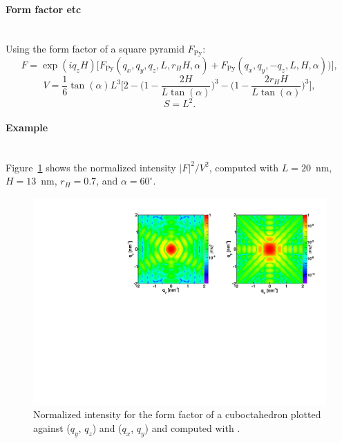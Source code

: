\paragraph{Form factor etc}\strut\\
Using the form factor of a square pyramid $F_\text{Py}$:
\begin{equation*}
F=\exp(iq_zH)\Big[F_\text{Py}(q_x,q_y, q_z, L, r_H H,\alpha)
                 +F_\text{Py}(q_x, q_y, -q_z, L, H, \alpha))\Big],
\end{equation*}
\begin{equation*}
  V= \dfrac{1}{6} \tan(\alpha)L^3 \Big[ 2
         - \Big(1 - \dfrac{2H }{L\tan(\alpha)} \Big)^3
           - \Big(1 - \dfrac{2 r_H
             H}{L\tan(\alpha) }\Big)^3\Big],
\end{equation*}
\begin{equation*}
  S =L^2.
\end{equation*}

\paragraph{Example}\strut\\
Figure~\ref{fig:FFcuboctahEx} shows the normalized intensity $|F|^2/V^2$, computed with $L=20$~nm, $H=13$~nm, $r_H=0.7$, and $\alpha=60^{\circ}$.
\begin{figure}[h]
\begin{center}
\includegraphics[angle=-90,width=\textwidth]{fig/ff/figffcuboctah.pdf}
\end{center}
\caption{Normalized intensity for the form factor of a cuboctahedron plotted against ($q_y$, $q_z$) and  ($q_x$, $q_y$) and computed with .}
\label{fig:FFcuboctahEx}
\end{figure}

